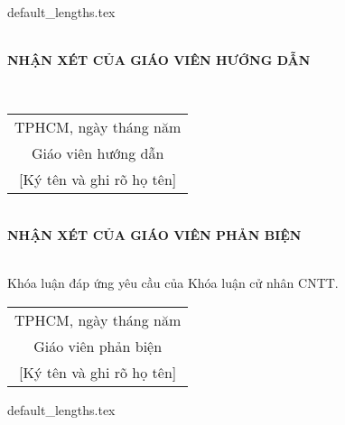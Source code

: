 \documentclass[class=article, crop=false]{standalone}
\begin{document}
	{default_lengths.tex}
	\setlength{\parindent}{0.2cm}
	\thisfancypage{%
		\fbox
	}{}
	\thispagestyle{empty}
	\begin{center}
		\leavevmode \\
		\fontsize{12pt}{14.4pt}\selectfont\bfseries
		NHẬN XÉT CỦA GIÁO VIÊN HƯỚNG DẪN \\[\baselineskip]
	\end{center}
	\fontsize{13pt}{15.6pt}\selectfont\rmfamily
	\par\makebox[15cm]{\dotfill}\\
	\begin{flushright}
		\begin{tabular}{c}
			TPHCM, ngày\makebox[1cm]{\dotfill}
			tháng\makebox[1cm]{\dotfill}
			năm\makebox[1cm]{\dotfill} \\
			Giáo viên hướng dẫn \\

			[Ký tên và ghi rõ họ tên]
		\end{tabular}		
	\end{flushright}
	\newpage
	\thisfancypage{%
		\fbox
	}{}
	\thispagestyle{empty}
	\begin{center}
		\leavevmode \\
		\fontsize{12pt}{14.4pt}\selectfont\bfseries
		NHẬN XÉT CỦA GIÁO VIÊN PHẢN BIỆN \\[\baselineskip]
	\end{center}
	\fontsize{13pt}{15.6pt}\selectfont\rmfamily
	\par\makebox[15cm]{\dotfill}\\
	\forloop{ct}{0}{\value{ct} < 21}{
		\indent\makebox[15cm]{\dotfill}\\
	}
	\indent Khóa luận đáp ứng yêu cầu của Khóa luận cử nhân CNTT.
	\begin{flushright}
		\begin{tabular}{c}
			TPHCM, ngày\makebox[1cm]{\dotfill}
			tháng\makebox[1cm]{\dotfill}
			năm\makebox[1cm]{\dotfill} \\
			Giáo viên phản biện \\

			[Ký tên và ghi rõ họ tên]
		\end{tabular}		
	\end{flushright}
	{default_lengths.tex}
\end{document}
